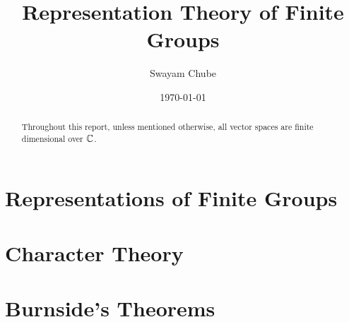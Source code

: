 \documentclass[oneside]{report}
\title{Representation Theory of Finite Groups}
\author{Swayam Chube}
\date{\today}
\begin{document}
\maketitle
\tableofcontents

\begin{abstract}
    Throughout this report, unless mentioned otherwise, all vector spaces are finite dimensional over $\mathbb{C}$.
\end{abstract}

\chapter{Representations of Finite Groups}


\chapter{Character Theory}


\chapter{Burnside's Theorems}

\end{document}
